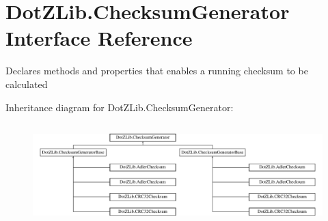 \hypertarget{interface_dot_z_lib_1_1_checksum_generator}{}\section{Dot\+Z\+Lib.\+Checksum\+Generator Interface Reference}
\label{interface_dot_z_lib_1_1_checksum_generator}


Declares methods and properties that enables a running checksum to be calculated  


Inheritance diagram for Dot\+Z\+Lib.\+Checksum\+Generator\+:\begin{figure}[H]
\begin{center}
\leavevmode
\includegraphics[height=3.962264cm]{interface_dot_z_lib_1_1_checksum_generator}
\end{center}
\end{figure}
